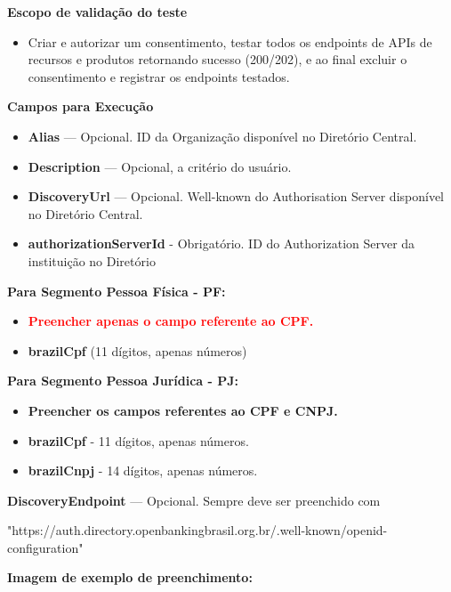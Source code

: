 \textbf{Escopo de validação do teste}

\begin{itemize}
    \item Criar e autorizar um consentimento, testar todos os endpoints de APIs de recursos e produtos retornando sucesso (200/202), e ao final excluir o consentimento e registrar os endpoints testados.
\end{itemize}

\textbf{Campos para Execução}

\begin{itemize}
    \item \textbf{Alias} — Opcional. ID da Organização disponível no Diretório Central.
    \item \textbf{Description} — Opcional, a critério do usuário.
    \item \textbf{DiscoveryUrl} — Opcional. Well-known do Authorisation Server disponível no Diretório 
    Central.
    \item \textbf{\textcolor{red!80}{authorizationServerId}} - Obrigatório. ID do Authorization Server da instituição no Diretório
\end{itemize}

\textbf{Para Segmento Pessoa Física - PF:}

\begin{itemize}
    \item \textbf{\textcolor{red}{Preencher apenas o campo referente ao CPF.}}
    \item \textbf{\textcolor{red!80}{brazilCpf}} (11 dígitos, apenas números)
\end{itemize}

\textbf{Para Segmento Pessoa Jurídica - PJ:}
\begin{itemize}
    \item \textbf{\textcolor{red!80}{Preencher os campos referentes ao CPF e CNPJ.}}
    \item \textbf{\textcolor{red!80}{brazilCpf}} - 11 dígitos, apenas números.
    \item \textbf{\textcolor{red!80}{brazilCnpj}} - 14 dígitos, apenas números.
\end{itemize}

\textbf{DiscoveryEndpoint} — Opcional. Sempre deve ser preenchido com

"https://auth.directory.openbankingbrasil.org.br/.well-known/openid-configuration"
\medskip

\textbf{Imagem de exemplo de preenchimento:}

